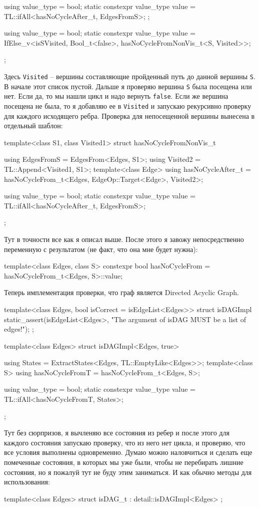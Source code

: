\documentclass{article}
\begin{document}
{\begin{cppcode}[\nonumbers]
{{    using value_type = bool;
    static constexpr value_type value = TL::ifAll<hasNoCycleAfter_t, EdgesFromS>;
  };

  using value_type = bool;
  static constexpr value_type value =
      IfElse_v<isSVisited, Bool_t<false>, hasNoCycleFromNonVis_t<S, Visited>>;
};
\end{cppcode}
Здесь \verb"Visited" -- вершины составляющие пройденный путь до данной вершины \verb"S".
В начале этот список пустой.
Дальше я проверяю вершина \verb"S" была посещена или нет.
Если да, то мы нашли цикл и надо вернуть \verb"false".
Если же вершина посещена не была, то я добавляю ее в \verb"Visited" и запускаю рекурсивно проверку для каждого исходящего ребра.
Проверка для непосещенной вершины вынесена в отдельный шаблон:
\begin{cppcode}[\nonumbers]
template<class S1, class Visited1>
struct hasNoCycleFromNonVis_t {
  using EdgesFromS = EdgesFrom<Edges, S1>;
  using Visited2 = TL::Append<Visited1, S1>;
  template<class Edge>
  using hasNoCycleAfter_t = hasNoCycleFrom_t<Edges, EdgeOp::Target<Edge>, Visited2>;
  
  using value_type = bool;
  static constexpr value_type value = TL::ifAll<hasNoCycleAfter_t, EdgesFromS>;
};
\end{cppcode}
Тут в точности все как я описал выше.
После этого я завожу непосредственно переменную с результатом (не факт, что она мне будет нужна):
\begin{cppcode}[\nonumbers]
template<class Edges, class S>
constexpr bool hasNoCycleFrom = hasNoCycleFrom_t<Edges, S>::value;
\end{cppcode}
Теперь имплементация проверки, что граф является Directed Acyclic Graph.
\begin{cppcode}[\nonumbers]
template<class Edges, bool isCorrect = isEdgeList<Edges>>
struct isDAGImpl {
  static_assert(isEdgeList<Edges>, "The argument of isDAG MUST be a list of edges!");
};

template<class Edges>
struct isDAGImpl<Edges, true> {
  using States = ExtractStates<Edges, TL::EmptyLike<Edges>>;
  template<class S>
  using hasNoCycleFromT = hasNoCycleFrom_t<Edges, S>;

  using value_type = bool;
  static constexpr value_type value = TL::ifAll<hasNoCycleFromT, States>;
};
\end{cppcode}
Тут без сюрпризов, я вычленяю все состояния из ребер и после этого для каждого состояния запускаю проверку, что из него нет цикла, и проверяю, что все условия выполнены одновременно.
Думаю можно наловчиться и сделать еще помеченные состояния, в которых мы уже были, чтобы не перебирать лишние состояния, но я пожалуй тут не буду этим заниматься.
И как обычно методы для использования:
\begin{cppcode}[\nonumbers]
template<class Edges>
struct isDAG_t : detail::isDAGImpl<Edges> {};


\end{cppcode}}
\end{document}
